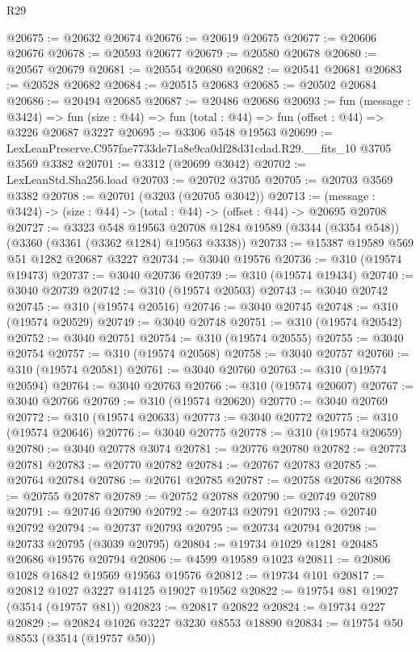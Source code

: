\begin{lexlean}{R29}
\begin{coremodule}
@20675 := @20632 @20674
@20676 := @20619 @20675
@20677 := @20606 @20676
@20678 := @20593 @20677
@20679 := @20580 @20678
@20680 := @20567 @20679
@20681 := @20554 @20680
@20682 := @20541 @20681
@20683 := @20528 @20682
@20684 := @20515 @20683
@20685 := @20502 @20684
@20686 := @20494 @20685
@20687 := @20486 @20686
@20693 := fun (message : @3424) =>
  fun (size : @44) => fun (total : @44) => fun (offset : @44) => @3226 @20687 @3227
@20695 := @3306 @548 @19563
@20699 := LexLeanPreserve.C957fae7733de71a8e9ca0df28d31cdad.R29.__fits_10 @3705 @3569 @3382
@20701 := @3312 (@20699 @3042)
@20702 := LexLeanStd.Sha256.load
@20703 := @20702 @3705
@20705 := @20703 @3569 @3382
@20708 := @20701 (@3203 (@20705 @3042))
@20713 := (message : @3424) -> (size : @44) -> (total : @44) -> (offset : @44) -> @20695 @20708
@20727 := @3323
    @548
    @19563
    @20708
    @1284
    @19589
    (@3344 (@3354 @548))
    (@3360 (@3361 (@3362 @1284) @19563 @3338))
@20733 := @15387 @19589 @569 @51 @1282 @20687 @3227
@20734 := @3040 @19576
@20736 := @310 (@19574 @19473)
@20737 := @3040 @20736
@20739 := @310 (@19574 @19434)
@20740 := @3040 @20739
@20742 := @310 (@19574 @20503)
@20743 := @3040 @20742
@20745 := @310 (@19574 @20516)
@20746 := @3040 @20745
@20748 := @310 (@19574 @20529)
@20749 := @3040 @20748
@20751 := @310 (@19574 @20542)
@20752 := @3040 @20751
@20754 := @310 (@19574 @20555)
@20755 := @3040 @20754
@20757 := @310 (@19574 @20568)
@20758 := @3040 @20757
@20760 := @310 (@19574 @20581)
@20761 := @3040 @20760
@20763 := @310 (@19574 @20594)
@20764 := @3040 @20763
@20766 := @310 (@19574 @20607)
@20767 := @3040 @20766
@20769 := @310 (@19574 @20620)
@20770 := @3040 @20769
@20772 := @310 (@19574 @20633)
@20773 := @3040 @20772
@20775 := @310 (@19574 @20646)
@20776 := @3040 @20775
@20778 := @310 (@19574 @20659)
@20780 := @3040 @20778 @3074
@20781 := @20776 @20780
@20782 := @20773 @20781
@20783 := @20770 @20782
@20784 := @20767 @20783
@20785 := @20764 @20784
@20786 := @20761 @20785
@20787 := @20758 @20786
@20788 := @20755 @20787
@20789 := @20752 @20788
@20790 := @20749 @20789
@20791 := @20746 @20790
@20792 := @20743 @20791
@20793 := @20740 @20792
@20794 := @20737 @20793
@20795 := @20734 @20794
@20798 := @20733 @20795 (@3039 @20795)
@20804 := @19734 @1029 @1281 @20485 @20686 @19576 @20794
@20806 := @4599 @19589 @1023
@20811 := @20806 @1028 @16842 @19569 @19563 @19576
@20812 := @19734 @101
@20817 := @20812 @1027 @3227 @14125 @19027 @19562
@20822 := @19754 @81 @19027 (@3514 (@19757 @81))
@20823 := @20817 @20822
@20824 := @19734 @227
@20829 := @20824 @1026 @3227 @3230 @8553 @18890
@20834 := @19754 @50 @8553 (@3514 (@19757 @50))

\end{coremodule}
\end{lexlean}
